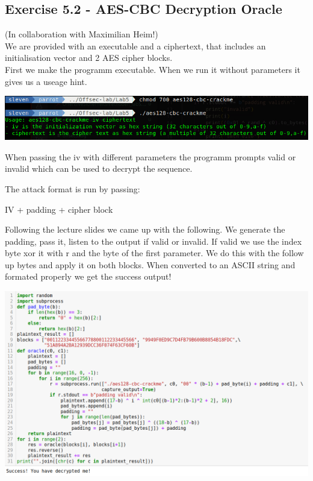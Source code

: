 \documentclass[a4paper,10pt]{article}
\begin{document}
\subsection{Exercise 5.2 - AES-CBC Decryption Oracle}
(In collaboration with Maximilian Heim!)\\
We are provided with an executable and a ciphertext, that includes an initialisation vector and 2 AES cipher blocks.\\
First we make the programm executable. When we run it without parameters it gives us a useage hint.
\begin{center}
 \includegraphics[scale=0.5]{hint.png}
\end{center}
When passing the iv with different parameters the programm prompts valid or invalid which can be used to decrypt the sequence. 

The attack format is run by passing:
\begin{center}
 IV + padding + cipher block
\end{center}
Following the lecture slides we came up with the following.
We generate the padding, pass it, listen to the output if valid or invalid. If valid we use the index byte xor it with r and the byte of the first parameter. We do this with the follow up bytes and apply it on both blocks.
When converted to an ASCII string and formated properly we get the success output!
\begin{center}
 \includegraphics[scale=0.45]{sucess.png}

\end{center}
\end{document}
